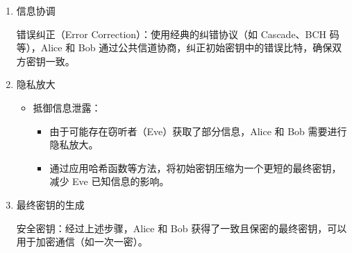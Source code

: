 \begin{itemize}
\begin{enumerate}
		\item 信息协调
		
		错误纠正（Error Correction）：使用经典的纠错协议（如 Cascade、BCH 码等），Alice 和 Bob 通过公共信道协商，纠正初始密钥中的错误比特，确保双方密钥一致。
		
		
		\item 隐私放大
		
		\begin{itemize}
			\item 抵御信息泄露：
			\begin{itemize}
				\item 由于可能存在窃听者（Eve）获取了部分信息，Alice 和 Bob 需要进行隐私放大。
				\item 通过应用哈希函数等方法，将初始密钥压缩为一个更短的最终密钥，减少 Eve 已知信息的影响。
			\end{itemize}
		\end{itemize}
		
		\item 最终密钥的生成
		
		安全密钥：经过上述步骤，Alice 和 Bob 获得了一致且保密的最终密钥，可以用于加密通信（如一次一密）。
		
	\end{enumerate}
	
\end{itemize}


